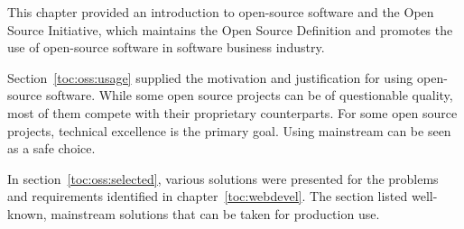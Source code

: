This chapter provided an introduction to open-source software and the 
Open Source Initiative, which maintains the Open Source Definition and 
promotes the use of open-source software in software business industry.

Section~\ref{toc:oss:usage} supplied the motivation and justification 
for using open-source software. While some open source projects can be 
of questionable quality, most of them compete with their proprietary 
counterparts. For some open source projects, technical excellence is 
the primary goal. Using mainstream  can be seen as a safe 
choice.

In section~\ref{toc:oss:selected}, various  solutions were 
presented for the problems and requirements identified in 
chapter~\ref{toc:webdevel}. The section listed well-known, mainstream 
 solutions that can be taken for production use.

